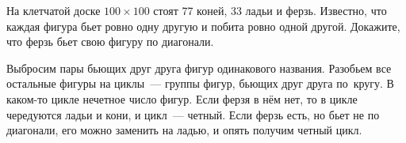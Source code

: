 \problem
На клетчатой доске $100 \times 100$ стоят 77 коней, 33 ладьи и ферзь.
Известно, что каждая фигура бьет ровно одну другую и побита ровно одной другой.
Докажите, что ферзь бьет свою фигуру по диагонали.

\solution
Выбросим пары бьющих друг друга фигур одинакового названия.
Разобьем все остальные фигуры на циклы~--- группы фигур, бьющих друг друга
по~кругу.
В каком-то цикле нечетное число фигур.
Если ферзя в нём нет, то в цикле чередуются ладьи и кони, и цикл~--- четный.
Если ферзь есть, но бьет не по диагонали, его можно заменить на ладью, и опять
получим четный цикл. 
\endproblem

